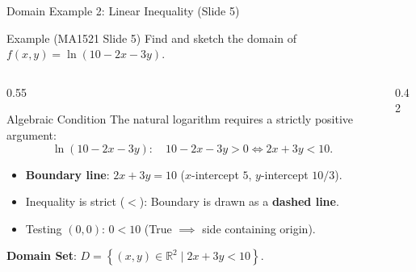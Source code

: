 \documentclass[aspectratio=169,10pt]{beamer}
\begin{document}
\begin{frame}{Domain Example 2: Linear Inequality (Slide 5)}
  \begin{exampleblock}{Example (MA1521 Slide 5)}
    Find and sketch the domain of $f(x, y) = \ln(10 - 2x - 3y)$.
  \end{exampleblock}

  \begin{columns}[T]
    \begin{column}{0.55\textwidth}
      \begin{block}{Algebraic Condition}
        \small
        The natural logarithm requires a strictly positive argument:
        \[
          \ln(10 - 2x - 3y): \quad 10 - 2x - 3y > 0 \iff 2x + 3y < 10.
        \]
        \begin{itemize}
          \item \textbf{Boundary line}: $2x + 3y = 10$ ($x$-intercept $5$, $y$-intercept $10/3$).
          \item Inequality is strict ($<$): Boundary is drawn as a \textbf{dashed line}.
          \item Testing $(0,0)$: $0 < 10$ (True $\implies$ side containing origin).
        \end{itemize}
        \textbf{Domain Set}: $D = \left\{(x, y) \in \mathbb{R}^2 \mid 2x + 3y < 10 \right\}$.
      \end{block}
    \end{column}

    \begin{column}{0.42\textwidth}
      \centering
    \end{column}
  \end{columns}
\end{frame}
\end{document}
